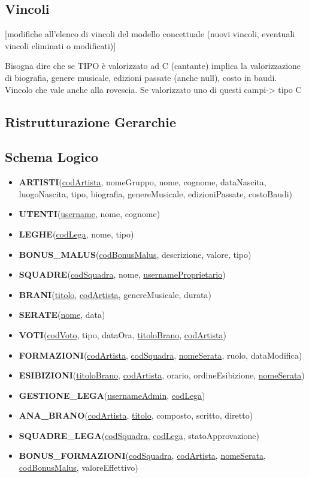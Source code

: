 \documentclass[a4paper,12pt]{article}
\begin{document}
\subsection{Vincoli}
[modifiche all'elenco di vincoli del modello concettuale (nuovi vincoli, eventuali vincoli eliminati o modificati)]

Bisogna dire che se TIPO è valorizzato ad C (cantante) implica la valorizzazione di biografia, genere musicale, edizioni passate (anche null), costo in baudi. Vincolo che vale anche alla rovescia. Se valorizzato uno di questi campi-> tipo C

\subsection{Ristrutturazione Gerarchie}

\subsection{Schema Logico}
	\begin{itemize}
		\item \textbf{ARTISTI}(\underline{codArtista}, nomeGruppo, nome, cognome, dataNascita, luogoNascita, tipo, biografia, genereMusicale, edizioniPassate, costoBaudi)
		\item \textbf{UTENTI}(\underline{username}, nome, cognome)
		\item \textbf{LEGHE}(\underline{codLega}, nome, tipo)
		\item \textbf{BONUS\_MALUS}(\underline{codBonusMalus}, descrizione, valore, tipo)
		\item \textbf{SQUADRE}(\underline{codSquadra}, nome, \underline{usernameProprietario})
		\item \textbf{BRANI}(\underline{titolo}, \underline{codArtista}, genereMusicale, durata)
		\item \textbf{SERATE}(\underline{nome}, data)
		\item \textbf{VOTI}(\underline{codVoto}, tipo, dataOra, \underline{titoloBrano}, \underline{codArtista})
		\item \textbf{FORMAZIONI}(\underline{codArtista}, \underline{codSquadra}, \underline{nomeSerata}, ruolo, dataModifica)
		\item \textbf{ESIBIZIONI}(\underline{titoloBrano}, \underline{codArtista}, orario, ordineEsibizione, \underline{nomeSerata})
		\item \textbf{GESTIONE\_LEGA}(\underline{usernameAdmin}, \underline{codLega})
		\item \textbf{ANA\_BRANO}(\underline{codArtista}, \underline{titolo}, composto, scritto, diretto)
		\item \textbf{SQUADRE\_LEGA}(\underline{codSquadra}, \underline{codLega}, statoApprovazione)
		\item \textbf{BONUS\_FORMAZIONI}(\underline{codSquadra}, \underline{codArtista}, \underline{nomeSerata}, \underline{codBonusMalus}, valoreEffettivo)
	\end{itemize}
	
\end{document}
